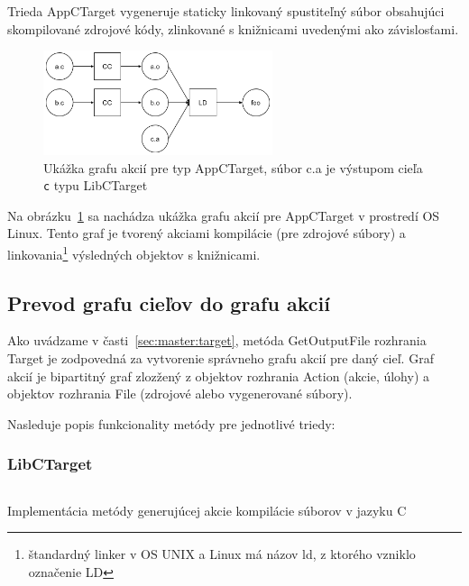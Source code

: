 Trieda AppCTarget vygeneruje staticky linkovaný spustiteľný súbor obsahujúci
skompilované zdrojové kódy, zlinkované s knižnicami uvedenými ako závislosťami.

\begin{figure}[h]
  \centerline{\includegraphics[width=0.6\textwidth]{images/appctarget}}
  \caption[Graf akcií pre typ AppCTarget]{Ukážka grafu akcií pre typ AppCTarget,
  súbor c.a je výstupom cieľa \texttt{c} typu LibCTarget}
  \label{img:appctarget}
\end{figure}

Na obrázku~\ref{img:appctarget} sa nachádza ukážka grafu akcií pre AppCTarget
v prostredí OS Linux. Tento graf je tvorený akciami kompilácie (pre zdrojové
súbory) a linkovania\footnote{štandardný linker v OS UNIX a Linux má názov ld,
z ktorého vzniklo označenie LD} výsledných objektov s knižnicami.

\subsection{Prevod grafu cie\v{l}ov do grafu akci\'{i}}
\label{sec:master:target2action}

Ako uvádzame v časti~\ref{sec:master:target}, metóda GetOutputFile rozhrania Target
je zodpovedná za vytvorenie správneho grafu akcií pre daný cieľ. Graf akcií je
bipartitný graf zlozžený z objektov rozhrania Action (akcie, úlohy) a objektov
rozhrania File (zdrojové alebo vygenerované súbory).

Nasleduje popis funkcionality metódy pre jednotlivé triedy:

\subsubsection{LibCTarget}

\begin{listing}[h]
  \inputminted[frame=lines,framesep=2mm,linenos,fontsize=\scriptsize,firstline=23,lastline=61]{go}{/home/pepol/src/imterra/forge/client/actions/util.go}
  \caption[Pomocná metóda MakeCObjects]{Implementácia metódy generujúcej akcie
  kompilácie súborov v jazyku C}
  \label{lst:target2action:makecobjs}
\end{listing}

